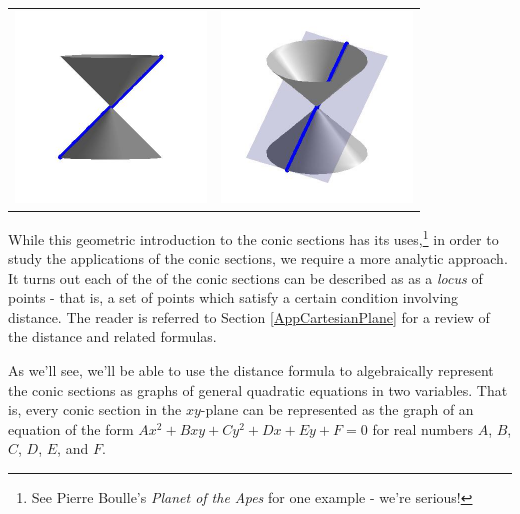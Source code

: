 \begin{center}
\begin{tabular}{cc}
\includegraphics[width=2in]{./IntrotoConicsGraphics/Tline01.jpg} & \includegraphics[width=2in]{./IntrotoConicsGraphics/Tline02.jpg} \\

\end{tabular}

\end{center}

\enlargethispage{.5in}
While this geometric introduction to the conic sections has its uses,\footnote{See Pierre Boulle's \textit{Planet of the Apes} for one example - we're serious!} in order to study the applications of the conic sections, we require a more analytic approach.  It turns out each of the  of the conic sections can be described as as a \textit{locus} of points - that is, a set of points which satisfy a certain condition involving distance.  The reader is referred to Section \ref{AppCartesianPlane} for a review of the distance and related formulas.

As we'll see, we'll be able to use the distance formula to algebraically represent the conic sections as  graphs of general quadratic equations in two variables.  That is, every conic section in the $xy$-plane can be represented as the graph of an equation of the form $Ax^2+Bxy+Cy^2+Dx+Ey +F = 0$ for real numbers $A$, $B$, $C$, $D$, $E$, and $F$.

\closegraphsfile